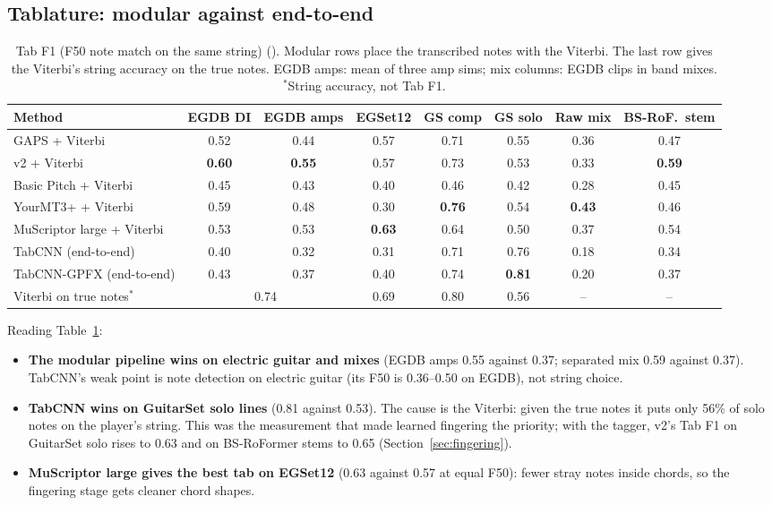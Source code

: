 \subsection{Tablature: modular against end-to-end}
\label{sec:bench-tab}

\begin{table}[h]
\centering
\caption{Tab F1 (F50 note match on the same string) \measured{}
(). Modular rows place the transcribed notes with the
Viterbi. The last row gives the Viterbi's string accuracy on the true notes.
EGDB amps: mean of three amp sims; mix columns: EGDB clips in band mixes.
$^{*}$String accuracy, not Tab F1.}
\label{tab:bench-tab}
\footnotesize
\setlength{\tabcolsep}{3pt}
\begin{tabular}{@{}lccccccc@{}}
\toprule
Method & EGDB DI & EGDB amps & EGSet12 & GS comp & GS solo & Raw mix & BS-RoF.\ stem \\
\midrule
GAPS + Viterbi & 0.52 & 0.44 & 0.57 & 0.71 & 0.55 & 0.36 & 0.47 \\
v2 + Viterbi & \textbf{0.60} & \textbf{0.55} & 0.57 & 0.73 & 0.53 & 0.33 & \textbf{0.59} \\
Basic Pitch + Viterbi & 0.45 & 0.43 & 0.40 & 0.46 & 0.42 & 0.28 & 0.45 \\
YourMT3+ + Viterbi & 0.59 & 0.48 & 0.30 & \textbf{0.76} & 0.54 & \textbf{0.43} & 0.46 \\
MuScriptor large + Viterbi & 0.53 & 0.53 & \textbf{0.63} & 0.64 & 0.50 & 0.37 & 0.54 \\
\midrule
TabCNN (end-to-end) & 0.40 & 0.32 & 0.31 & 0.71 & 0.76 & 0.18 & 0.34 \\
TabCNN-GPFX (end-to-end) & 0.43 & 0.37 & 0.40 & 0.74 & \textbf{0.81} & 0.20 & 0.37 \\
\midrule
Viterbi on true notes$^{*}$ & \multicolumn{2}{c}{0.74} & 0.69 & 0.80 & 0.56 & -- & -- \\
\bottomrule
\end{tabular}
\end{table}

Reading Table~\ref{tab:bench-tab}:
\begin{itemize}
\item \textbf{The modular pipeline wins on electric guitar and mixes} (EGDB amps
  0.55 against 0.37; separated mix 0.59 against 0.37). TabCNN's weak point is
  note detection on electric guitar (its F50 is 0.36--0.50 on EGDB), not string
  choice.
\item \textbf{TabCNN wins on GuitarSet solo lines} (0.81 against 0.53). The
  cause is the Viterbi: given the true notes it puts only 56\% of solo notes on
  the player's string. This was the measurement that made learned fingering the
  priority; with the tagger, v2's Tab F1 on GuitarSet solo rises to 0.63 and on
  BS-RoFormer stems to 0.65 (Section~\ref{sec:fingering}).
\item \textbf{MuScriptor large gives the best tab on EGSet12} (0.63 against 0.57
  at equal F50): fewer stray notes inside chords, so the fingering stage gets
  cleaner chord shapes.
\end{itemize}

